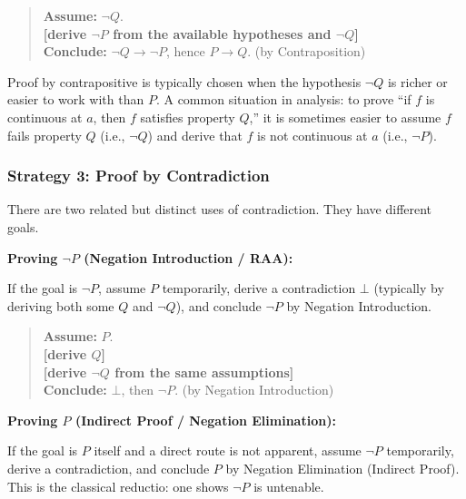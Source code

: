 \begin{quote}
\textbf{Assume:} $\neg Q$. \\
\textbf{[derive $\neg P$ from the available hypotheses and $\neg Q$]} \\
\textbf{Conclude:} $\neg Q \to \neg P$, hence $P \to Q$. \quad (by Contraposition)
\end{quote}

\begin{remark}
Proof by contrapositive is typically chosen when the hypothesis $\neg Q$ is
richer or easier to work with than $P$. A common situation in analysis: to
prove ``if $f$ is continuous at $a$, then $f$ satisfies property $Q$,'' it is
sometimes easier to assume $f$ fails property $Q$ (i.e., $\neg Q$) and derive
that $f$ is not continuous at $a$ (i.e., $\neg P$).
\end{remark}


\subsubsection*{Strategy 3: Proof by Contradiction}

There are two related but distinct uses of contradiction. They have different
goals.

\medskip
\noindent\textbf{Proving $\neg P$ (Negation Introduction / RAA):}

If the goal is $\neg P$, assume $P$ temporarily, derive a contradiction $\bot$
(typically by deriving both some $Q$ and $\neg Q$), and conclude $\neg P$ by
Negation Introduction.

\begin{quote}
\textbf{Assume:} $P$. \\
\textbf{[derive $Q$]} \\
\textbf{[derive $\neg Q$ from the same assumptions]} \\
\textbf{Conclude:} $\bot$, then $\neg P$. \quad (by Negation Introduction)
\end{quote}

\medskip
\noindent\textbf{Proving $P$ (Indirect Proof / Negation Elimination):}

If the goal is $P$ itself and a direct route is not apparent, assume $\neg P$
temporarily, derive a contradiction, and conclude $P$ by Negation Elimination
(Indirect Proof). This is the classical reductio: one shows $\neg P$ is
untenable.

